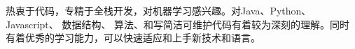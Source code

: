 

\begin{cvparagraph}

热衷于代码，专精于全栈开发，对机器学习感兴趣。对Java、Python、 Javascript、 数据结构、 算法、和写简洁可维护代码有着较为深刻的理解。同时有着优秀的学习能力，可以快速适应和上手新技术和语言。
\end{cvparagraph}
